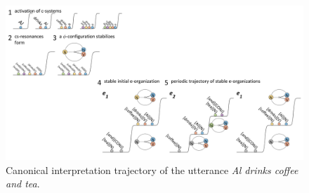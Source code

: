   
\begin{figure}
\includegraphics[width=\textwidth]{figures/Tilsen-img121.png}
\caption{Canonical interpretation trajectory of the utterance \textit{Al drinks coffee and tea}.}
\label{fig:6:2}
\end{figure}

